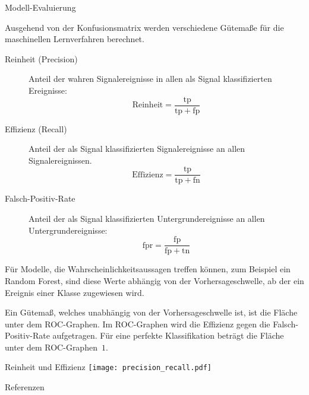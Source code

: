 \documentclass[t]{beamer}
\begin{document}
\begin{columns}[onlytextwidth]
\begin{column}{0.5\textwidth}
\begin{block}{Modell-Evaluierung}
\begin{multicols}{2}
          Ausgehend von der Konfusionsmatrix werden verschiedene Gütemaße für die maschinellen
          Lernverfahren berechnet.
          \begin{description}
            \item[Reinheit (Precision)] Anteil der wahren Signalereignisse in allen als Signal klassifizierten
              Ereignisse:
              \begin{equation}
                \mathrm{Reinheit} = \frac{\mathrm{tp}}{\mathrm{tp} + \mathrm{fp}}
              \end{equation}
            \item[Effizienz (Recall)] Anteil der als Signal klassifizierten Signalereignisse an
              allen Signalereignissen.
              \begin{equation}
                \mathrm{Effizienz} = \frac{\mathrm{tp}}{\mathrm{tp} + \mathrm{fn}}
              \end{equation}
            \item[Falsch-Positiv-Rate] Anteil der als Signal klassifizierten Untergrundereignisse
              an allen Untergrundereignisse:
              \begin{equation}
                \mathrm{fpr} = \frac{\mathrm{fp}}{\mathrm{fp} + \mathrm{tn}}
              \end{equation}
          \end{description}

          Für Modelle, die Wahrscheinlichkeitsaussagen treffen können, zum Beispiel
          ein Random Forest, sind diese Werte abhängig von der Vorhersageschwelle, ab
          der ein Ereignis einer Klasse zugewiesen wird.

          Ein Gütemaß, welches unabhängig von der Vorhersageschwelle ist, ist die Fläche
          unter dem ROC-Graphen. Im ROC-Graphen wird die Effizienz gegen die Falsch-Positiv-Rate
          aufgetragen.
          Für eine perfekte Klassifikation beträgt die Fläche unter dem ROC-Graphen~$1$.
        \end{multicols}
      \end{block}
      \begin{block}{Reinheit und Effizienz}
        \texttt{[image: precision\_recall.pdf]}
      \end{block}

      \begin{block}[]{Referenzen}
        \begin{multicols}{2}
          \footnotesize%
          \printbibliography%
        \end{multicols}
      \end{block}
    \end{column}%
  \end{columns}%

\end{document}
